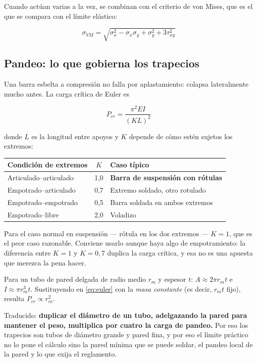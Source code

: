 Cuando actúan varias a la vez, se combinan con el criterio de von Mises, que es
el que se compara con el límite elástico:

\begin{equation}
  \sigma_{VM} = \sqrt{\sigma_x^2 - \sigma_x\sigma_y + \sigma_y^2 + 3\tau_{xy}^2}
  \label{eq:von_mises}
\end{equation}

\subsection{Pandeo: lo que gobierna los trapecios}

Una barra esbelta a compresión no falla por aplastamiento: colapsa lateralmente
mucho antes. La carga crítica de Euler es

\begin{equation}
  P_{cr} = \frac{\pi^2 E I}{(K L)^2}
  \label{eq:euler}
\end{equation}

donde $L$ es la longitud entre apoyos y $K$ depende de cómo estén sujetos los
extremos:

\begin{center}
\begin{tabular}{@{}lcl@{}}
\toprule
\textbf{Condición de extremos} & $K$ & \textbf{Caso típico} \\
\midrule
Articulado--articulado & 1{,}0 & \textbf{Barra de suspensión con rótulas} \\
Empotrado--articulado  & 0{,}7 & Extremo soldado, otro rotulado \\
Empotrado--empotrado   & 0{,}5 & Barra soldada en ambos extremos \\
Empotrado--libre       & 2{,}0 & Voladizo \\
\bottomrule
\end{tabular}
\end{center}

Para el caso normal en suspensión --- rótula en los dos extremos --- $K = 1$, que
es el peor caso razonable. Conviene usarlo aunque haya algo de empotramiento: la
diferencia entre $K=1$ y $K=0{,}7$ duplica la carga crítica, y esa no es una
apuesta que merezca la pena hacer.

\begin{clave}
Para un tubo de pared delgada de radio medio $r_m$ y espesor $t$:
$A \approx 2\pi r_m t$ e $I \approx \pi r_m^3 t$. Sustituyendo en
\eqref{eq:euler} con la \emph{masa constante} (es decir, $r_m t$ fijo), resulta
$P_{cr} \propto r_m^2$.

Traducido: \textbf{duplicar el diámetro de un tubo, adelgazando la pared para
mantener el peso, multiplica por cuatro la carga de pandeo.} Por eso los
trapecios son tubos de diámetro grande y pared fina, y por eso el límite práctico
no lo pone el cálculo sino la pared mínima que se puede soldar, el pandeo local
de la pared y lo que exija el reglamento.
\end{clave}

